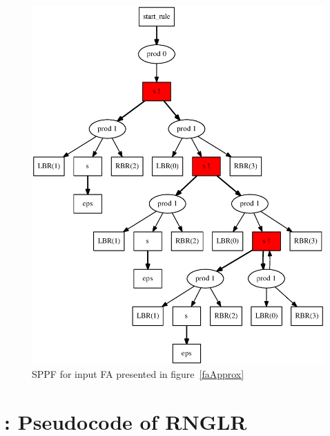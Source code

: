 \begin{figure}
    \begin{center}
        \includegraphics[scale=0.3]{dot/out3.eps}
    \end{center}
    \caption{SPPF for input FA presented in figure~\ref{faApprox}}
    \label{resultSPPF}
\end{figure}

\section{\appendixname: Pseudocode of RNGLR}\label{RNGLRCode}

